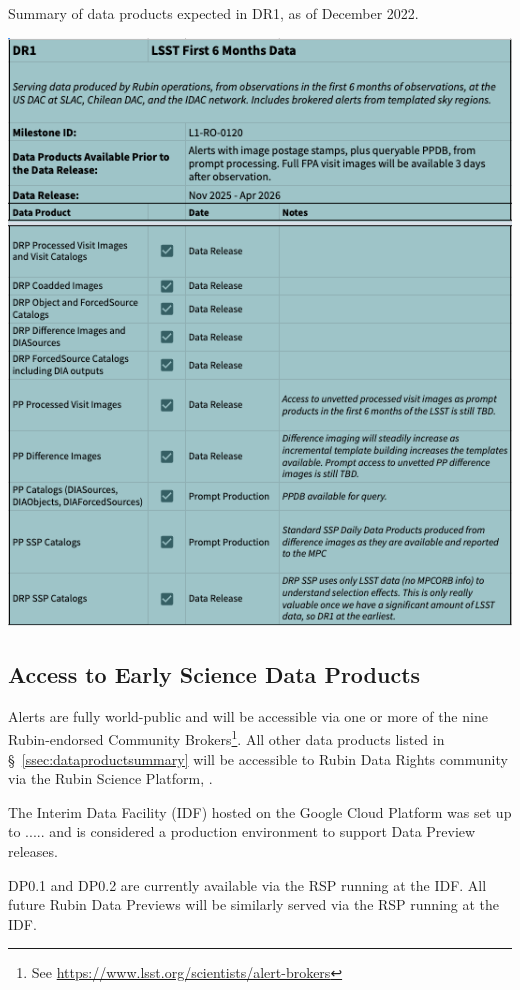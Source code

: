 \begin{table}
\caption{Summary of data products expected in DR1, as of December 2022.}
\label{tab:dr-one-products}
\includegraphics[width=\linewidth]{figures/DR1-products}
\end{table}


\subsection{Access to Early Science  Data Products} \label{ssec:dataaccess}
Alerts are fully world-public and will be accessible via one or more of the nine Rubin-endorsed Community Brokers\footnote{See \url{https://www.lsst.org/scientists/alert-brokers}}.
All other data products listed in \S~\ref{ssec:dataproductsummary} will be accessible to Rubin Data Rights community via the Rubin Science Platform, \citep{LSE-319}.

The Interim Data Facility (IDF) hosted on the Google Cloud Platform was set up to ..... and  is considered a production environment to support Data Preview releases. 

DP0.1 and DP0.2 are currently available via the RSP running at the IDF.
All future Rubin Data Previews will be similarly served via the RSP running at the IDF. 

